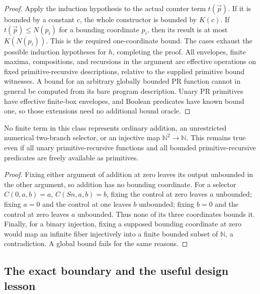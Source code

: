 \begin{proof}
Apply the induction hypothesis to the actual counter term $t(\vec p)$.
If it is bounded by a constant $c$, the whole constructor is bounded by
$K(c)$.  If $t(\vec p)\le N(p_i)$ for a bounding coordinate $p_i$, then
its result is at most $K(N(p_i))$.  This is the required one-coordinate
bound.  The cases exhaust the possible induction hypotheses for $h$,
completing the proof.  All envelopes, finite maxima, compositions, and
recursions in the argument are effective operations on fixed
primitive-recursive descriptions, relative to the supplied primitive bound
witnesses. A bound for an arbitrary globally bounded PR function cannot in
general be computed from its bare program description. Unary PR primitives
have effective finite-box envelopes, and Boolean predicates have known
bound one, so those extensions need no additional bound oracle.
\end{proof}

\begin{corollary}
\label{cor:single-body-exclusions}
No finite term in this class represents ordinary addition, an unrestricted
numerical two-branch selector, or an injective map
$\mathbb N^2\longrightarrow\mathbb N$.
This remains true even if all unary primitive-recursive functions and all
bounded primitive-recursive predicates are freely available as primitives.
\end{corollary}
\begin{proof}
Fixing either argument of addition at zero leaves its output unbounded
in the other argument, so addition has no bounding coordinate.
For a selector $C(0,a,b)=a$, $C(Sn,a,b)=b$, fixing the control at zero
leaves $a$ unbounded; fixing $a=0$ and the control at one leaves $b$
unbounded; fixing $b=0$ and the control at zero leaves $a$ unbounded.
Thus none of its three coordinates bounds it.  Finally, for a binary
injection, fixing a supposed bounding coordinate at zero would map an
infinite fiber injectively into a finite bounded subset of $\mathbb N$,
a contradiction.  A global bound fails for the same reasons.
\end{proof}

\subsection{The exact boundary and the useful design lesson}

